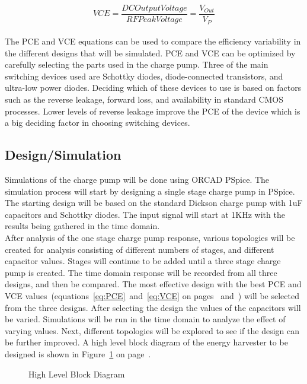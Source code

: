 \documentclass[12pt]{article}
\begin{document}
\begin{equation}
VCE = \frac{DC Output Voltage}{RF Peak Voltage} = \frac{V_{Out}}{V_{P}}\label{eq:VCE}
\end{equation}
\\
	The PCE and VCE equations can be used to compare the efficiency variability in the different designs that will be simulated. PCE and VCE can be optimized by carefully selecting the parts used in the charge pump. Three of the main switching devices used are Schottky diodes, diode-connected transistors, and ultra-low power diodes. Deciding which of these devices to use is based on factors such as the reverse leakage, forward loss, and availability in standard CMOS processes. Lower levels of reverse leakage improve the PCE of the device which is a big deciding factor in choosing switching devices.
	
	\subsection{Design/Simulation}
	Simulations of the charge pump will be done using ORCAD PSpice. The simulation process will start by designing a single stage charge pump in PSpice. The starting design will be based on the standard Dickson charge pump with 1uF capacitors and Schottky diodes. The input signal will start at 1KHz with the results being gathered in the time domain.\\
	
	\noindent After analysis of the one stage charge pump response, various topologies will be created for analysis consisting of different numbers of stages, and different capacitor values. Stages will continue to be added until a three stage charge pump is created. The time domain response will be recorded from all three designs, and then be compared. The most effective design with the best PCE and VCE values~(equations~\ref{eq:PCE}~and~\ref{eq:VCE} on pages~\pageref{eq:PCE} and~\pageref{eq:VCE}) will be selected from the three designs. After selecting the design the values of the capacitors will be varied. Simulations will be run in the time domain to analyze the effect of varying values. Next, different topologies will be explored to see if the design can be further improved. A high level block diagram of the energy harvester to be designed is shown in Figure~\ref{fig:HighLevel} on page~\pageref{fig:HighLevel}.\\
	
\vspace{0.5em}
\begin{figure}[H]
\caption{High Level Block Diagram}
\label{fig:HighLevel}
\end{figure}
\end{document}

